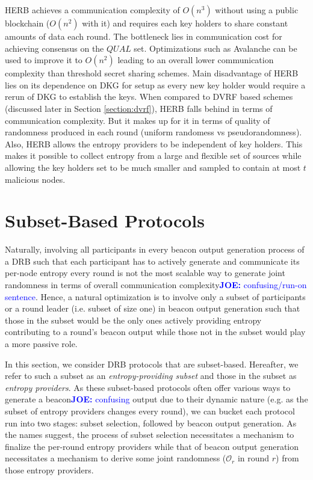 \documentclass[letterpaper,twocolumn,10pt]{article}
\theoremstyle{definition}
\theoremstyle{remark}
\newcommand{\joenote}[1]{\textcolor{blue}{\textbf{JOE:} #1}}
\begin{document}
HERB achieves a communication complexity of $O(n^3)$ without using a public blockchain ($O(n^2)$ with it) and requires each key holders to share constant amounts of data each round. The bottleneck lies in communication cost for achieving consensus on the $QUAL$ set. Optimizations such as Avalanche \cite{rocket2018snowflake} can be used to improve it to $O(n^2)$ leading to an overall lower communication complexity than threshold secret sharing schemes. Main disadvantage of HERB lies on its dependence on DKG for setup as every new key holder would require a rerun of DKG to establish the keys. When compared to DVRF based schemes (discussed later in Section \ref{section:dvrf}), HERB falls behind in terms of communication complexity. But it makes up for it in terms of quality of randomness produced in each round (uniform randomess vs pseudorandomness). Also, HERB allows the entropy providers to be independent of key holders. This makes it possible to collect entropy from a large and flexible set of sources while allowing the key holders set to be much smaller and sampled to contain at most $t$ malicious nodes.


\section{Subset-Based Protocols}
\label{section:subset-based}
Naturally, involving all participants in every beacon output generation process of a DRB such that each participant has to actively generate and communicate its per-node entropy every round is not the most scalable way to generate joint randomness in terms of overall communication complexity\joenote{confusing/run-on sentence}. Hence, a natural optimization is to involve only a subset of participants or a round leader (i.e. subset of size one) in beacon output generation such that those in the subset would be the only ones actively providing entropy contributing to a round's beacon output while those not in the subset would play a more passive role.

In this section, we consider DRB protocols that are subset-based. Hereafter, we refer to such a subset as an \textit{entropy-providing subset} and those in the subset as \textit{entropy providers}. As these subset-based protocols often offer various ways to generate a beacon\joenote{confusing} output due to their dynamic nature (e.g. as the subset of entropy providers changes every round), we can bucket each protocol run into two stages: subset selection, followed by beacon output generation. As the names suggest, the process of subset selection necessitates a mechanism to finalize the per-round entropy providers while that of beacon output generation necessitates a mechanism to derive some joint randomness ($\mathcal{O}_r$ in round $r$) from those entropy providers.
\end{document}
